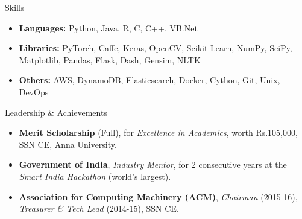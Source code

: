 \documentclass[]{mcdowellcv}
\begin{document}
	\begin{cvsection}{Skills}
		\begin{cvsubsection}{}{}{}
			\begin{itemize}
				\item \textbf{Languages:} Python, Java, R, C, C++, VB.Net
				\item \textbf{Libraries:} PyTorch, Caffe, Keras, OpenCV, Scikit-Learn, NumPy, SciPy, Matplotlib, Pandas, Flask, Dash, Gensim, NLTK
				\item \textbf{Others:} AWS, DynamoDB, Elasticsearch, Docker, Cython, Git, Unix, DevOps
			\end{itemize}
		\end{cvsubsection}
	\end{cvsection}

	\begin{cvsection}{Leadership \& Achievements}
		\begin{cvsubsection}{}{}{}
			\begin{itemize}
				\item \textbf{Merit Scholarship} (Full), for \textit{Excellence in Academics}, worth Rs.105,000, SSN CE, Anna University.
                \item\textbf{Government of India}, \textit{Industry Mentor}, for 2 consecutive years at the \textit{Smart India Hackathon} (world's largest).
                \item \textbf{Association for Computing Machinery (ACM)}, \textit{Chairman} (2015-16), \textit{Treasurer \& Tech Lead} (2014-15), SSN CE.
			\end{itemize}
		\end{cvsubsection}
	\end{cvsection}
\end{document}
